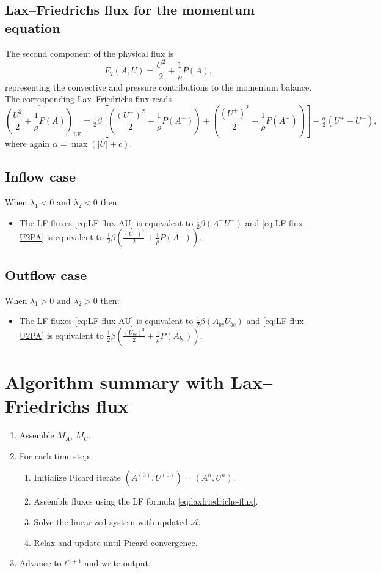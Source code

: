 \documentclass[11pt]{article}
\begin{document}
\subsection*{Lax--Friedrichs flux for the momentum equation}
The second component of the physical flux is
\[
  F_2(A,U) = \frac{U^2}{2} + \frac{1}{\rho}P(A) ,
\]
representing the convective and pressure contributions to the momentum balance.
The corresponding Lax--Friedrichs flux reads
\begin{equation}
  \widehat{\left(\frac{U^2}{2} + \frac{1}{\rho}P(A)\right)}_{\!\!\text{LF}}
  = \tfrac12\beta
    \left[
      \left(\frac{(U^-)^2}{2}+\frac{1}{\rho}P(A^-)\right)
      + \left(\frac{(U^+)^2}{2}+\frac{1}{\rho}P(A^+)\right)
    \right]
   - \tfrac{\alpha}{2}(U^+ - U^-),
  \label{eq:LF-flux-U2PA}
\end{equation}
where again $\alpha=\max(|U|+c)$.

\subsection*{Inflow case}
When $\lambda_1 < 0 \text{ and } \lambda_2 <0$ then:
\begin{itemize}
  \item The LF fluxes \eqref{eq:LF-flux-AU} is equivalent to $\tfrac12\beta (A^-U^-)$ and
  \eqref{eq:LF-flux-U2PA} is equivalent to $\tfrac12\beta
 \left(\frac{(U^-)^2}{2}+\frac{1}{\rho}P(A^-)\right)$.
\end{itemize}
\subsection*{Outflow case}
When $\lambda_1 > 0 \text{ and } \lambda_2 > 0$ then:
      \begin{itemize}
          \item The LF fluxes \eqref{eq:LF-flux-AU} is equivalent to $\tfrac12\beta (A_{bc} U_{bc})$ and
  \eqref{eq:LF-flux-U2PA} is equivalent to $\tfrac12\beta
 \left(\frac{(U_{bc})^2}{2}+\frac{1}{\rho}P(A_{bc})\right)$.
      \end{itemize}

\section{Algorithm summary with Lax--Friedrichs flux}
\begin{enumerate}
  \item Assemble $M_A$, $M_U$.
  \item For each time step:
  \begin{enumerate}
    \item Initialize Picard iterate $(A^{(0)},U^{(0)})=(A^n,U^n)$.
    \item Assemble fluxes using the LF formula \eqref{eq:laxfriedrichs-flux}.
    \item Solve the linearized system with updated $\mathcal{A}$.
    \item Relax and update until Picard convergence.
  \end{enumerate}
  \item Advance to $t^{n+1}$ and write output.
\end{enumerate}
\end{document}
